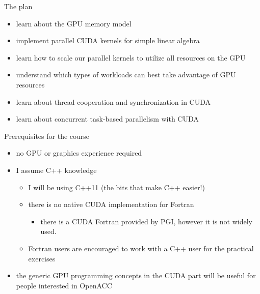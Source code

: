 
\begin{frame}[fragile]{}
    \begin{info}{The plan}
        \begin{itemize}
            \item learn about the GPU memory model
            \item implement parallel CUDA kernels for simple linear algebra
            \item learn how to scale our parallel kernels to utilize all resources on the GPU
            \item understand which types of workloads can best take advantage of GPU resources
            \item learn about thread cooperation and synchronization in CUDA
            \item learn about concurrent task-based parallelism with CUDA
        \end{itemize}
    \end{info}

\end{frame}

\begin{frame}[fragile]{}
    \begin{info}{Prerequisites for the course}
        \begin{itemize}
            \item no GPU or graphics experience required
            \item I assume C++ knowledge
            \begin{itemize}
                \item I will be using C++11 (the bits that make C++ easier!)
                \item there is no native CUDA implementation for Fortran
                \begin{itemize}
                    \item there is a CUDA Fortran provided by PGI, however it is not widely used.
                \end{itemize}
                \item Fortran users are encouraged to work with a C++ user for the practical exercises
            \end{itemize}
            \item the generic GPU programming concepts in the CUDA part will be useful for people interested in OpenACC
        \end{itemize}
    \end{info}

\end{frame}

